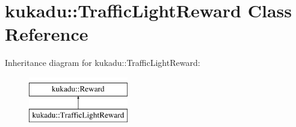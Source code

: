 \hypertarget{classkukadu_1_1TrafficLightReward}{\section{kukadu\-:\-:Traffic\-Light\-Reward Class Reference}
\label{classkukadu_1_1TrafficLightReward}
}
Inheritance diagram for kukadu\-:\-:Traffic\-Light\-Reward\-:\begin{figure}[H]
\begin{center}
\leavevmode
\includegraphics[height=2.000000cm]{classkukadu_1_1TrafficLightReward}
\end{center}
\end{figure}

